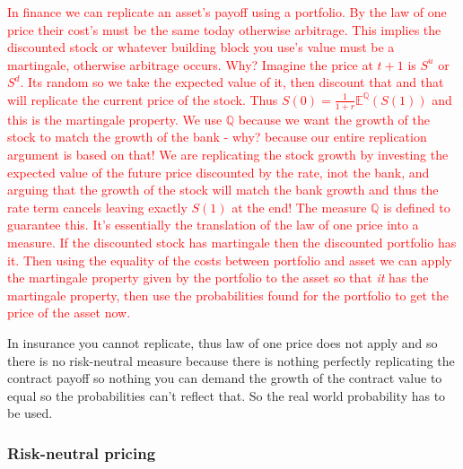 \documentclass[9pt]{extarticle}
\begin{document}
\textcolor{red}{In finance we can replicate an asset's payoff using a portfolio. By the law of one price their cost's must be the 
same today otherwise arbitrage. This implies the discounted stock or whatever building block you use's 
value must be a martingale, otherwise arbitrage occurs. Why? Imagine the price at $t+1$ is $S^u$ or $S^d$. Its random so 
we take the expected value of it, then discount that and that will replicate the current price of the stock. Thus 
$S(0)= \frac{1}{1+r}\mathbb{E}^{\mathbb{Q}}(S(1))$ and this is the martingale property. We use $\mathbb{Q}$ because we want the growth of the stock 
to match the growth of the bank - why? because our entire replication argument is based on that! We are replicating the stock growth by investing the expected value of the 
future price discounted by the rate, inot the bank, and arguing that the growth of the stock will match the bank growth and thus the rate term cancels leaving 
exactly $S(1)$ at the end! The measure $\mathbb{Q}$ is defined to guarantee this. It's essentially 
the translation of the law of one price into a measure. If the discounted stock has martingale then the discounted portfolio has it. Then using the equality of the costs
between portfolio and asset we can apply the martingale 
property given by the portfolio to the asset so that \textit{it} has the martingale property, then use the probabilities found for the 
portfolio to get the price of the asset now.}

In insurance you cannot replicate, thus law of one price does not apply and so there is no risk-neutral measure because there is nothing perfectly 
replicating the contract payoff so nothing you can demand the growth of the contract value to equal so the probabilities can't reflect that. So the 
real world probability has to be used.

\subsubsection{Risk-neutral pricing}
\end{document}
